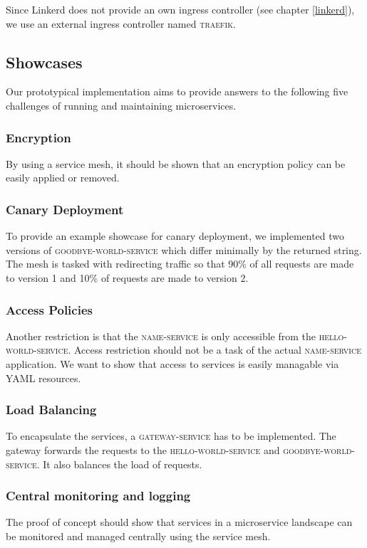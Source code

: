 Since Linkerd does not provide an own ingress controller (see chapter \ref{linkerd}), we use an external ingress controller named \textsc{traefik}.

\subsection{Showcases}

Our prototypical implementation aims to provide answers to the following five challenges of running and maintaining microservices.

\subsubsection{Encryption}

By using a service mesh, it should be shown that an encryption policy can be easily applied or removed.

\subsubsection{Canary Deployment}

To provide an example showcase for canary deployment, we implemented two versions of \textsc{goodbye-world-service} which differ minimally by the returned string. The mesh is tasked with redirecting traffic so that 90\% of all requests are made to version 1 and 10\% of requests are made to version 2.

\subsubsection{Access Policies}

Another restriction is that the \textsc{name-service} is only accessible from the \textsc{hello-world-service}. Access restriction should not be a task of the actual \textsc{name-service} application. We want to show that access to services is easily managable via YAML resources.

\subsubsection{Load Balancing}
To encapsulate the services, a \textsc{gateway-service} has to be implemented. The gateway forwards the requests to the \textsc{hello-world-service} and \textsc{goodbye-world-service}. It also balances the load of requests.

\subsubsection{Central monitoring and logging}
The proof of concept should show that services in a microservice landscape can be monitored and managed centrally using the service mesh.

